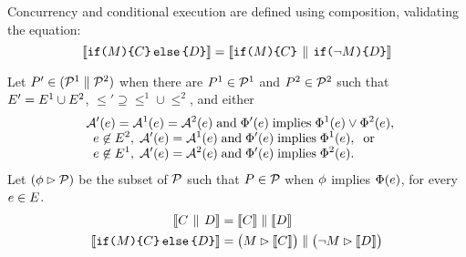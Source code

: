 Concurrency and conditional execution are defined using composition,
validating the equation:
\begin{displaymath}
  \llbracket\texttt{if}\allowbreak\texttt{(}M\texttt{)} \allowbreak\texttt{\{} C \texttt{\}}\,\allowbreak\texttt{else}\allowbreak\,\texttt{\{} D \texttt{\}}\rrbracket
  =
  \llbracket\texttt{if}\allowbreak\texttt{(}M\texttt{)} \allowbreak\texttt{\{} C \texttt{\}} \,\mathbin{\|}\, \texttt{if}\allowbreak\texttt{(}\lnot M\texttt{)} \allowbreak\texttt{\{} D \texttt{\}}\rrbracket
\end{displaymath}
\begin{definition}
Let $P' \in (\mathcal{P}^1 \parallel \mathcal{P}^2)$
when there are $P^1 \in \mathcal{P}^1$ and $P^2 \in \mathcal{P}^2$ such that
  $E' = E^1 \cup E^2$,
  ${\le'}\supseteq{\le^1}\cup{\le^2}$, and
  either
  \begin{align*}
    \;\;&\mathcal{A}'(e) = \mathcal{A}^1(e) = \mathcal{A}^2(e) \;\allowbreak\text{and}\allowbreak\; \Phi'(e) \; \allowbreak\text{implies}\allowbreak\; \Phi^1(e) \lor \Phi^2(e),\\[-1ex]
    &\;\;e \not\in E^2,\; \mathcal{A}'(e) = \mathcal{A}^1(e) \;\allowbreak\text{and}\allowbreak\; \Phi'(e) \; \allowbreak\text{implies}\allowbreak\; \Phi^1(e),\; \; \allowbreak\text{or}\allowbreak\;\\[-1ex]
    &\;\;e \not\in E^1,\; \mathcal{A}'(e) = \mathcal{A}^2(e) \;\allowbreak\text{and}\allowbreak\; \Phi'(e) \; \allowbreak\text{implies}\allowbreak\; \Phi^2(e).
  \end{align*}
  Let $(\phi \mathbin\rhd \mathcal{P})$ be the subset of $\mathcal{P}$ such that
  $P\in\mathcal{P}$ when $\phi$ implies $\Phi(e)$, for every
  $e\in E$. %
\begin{align*}
  \llbracket C \,\mathbin{\|}\, D\rrbracket & =
  \llbracket C\rrbracket \parallel \llbracket D\rrbracket 
  \\
  \llbracket\texttt{if}\allowbreak\texttt{(}M\texttt{)} \allowbreak\texttt{\{} C \texttt{\}}\,\allowbreak\texttt{else}\allowbreak\,\texttt{\{} D \texttt{\}}\rrbracket & =
  \bigl(M \mathbin\rhd \llbracket C\rrbracket\bigr) \parallel \bigl(\lnot M \mathbin\rhd \llbracket D\rrbracket\bigr) 
\end{align*}
\end{definition}
